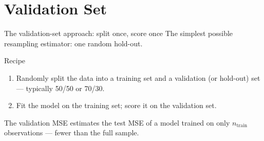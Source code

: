 \documentclass[aspectratio=169,11pt]{beamer}
\begin{document}
\section{Validation Set}

\begin{frame}{The validation-set approach: split once, score once}
  The simplest possible resampling estimator: one random hold-out.
  \begin{center}
  \end{center}
  \begin{block}{Recipe}
    \begin{enumerate}
      \item Randomly split the data into a training set and a
            validation (or hold-out) set --- typically 50/50 or 70/30.
      \item Fit the model on the training set; score it on the
            validation set.
    \end{enumerate}
  \end{block}
  \begin{readme}
    The validation MSE estimates the test MSE of a model trained on
    only $n_\mathrm{train}$ observations --- fewer than the full sample.
  \end{readme}
\end{frame}
\end{document}
